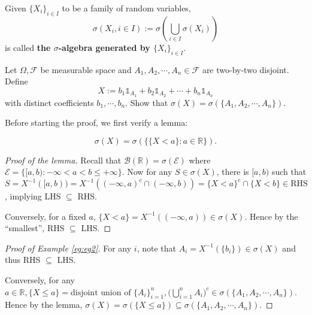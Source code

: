 \documentclass[11pt,singlecolumn, openany, citestyle=authoryear]{elegantbook}
\begin{document}
\begin{CJK}{UTF8}{gbsn}
\begin{definition}
    Given $\{X_i\}_{i \in I}$ to be a family of random variables, 
    $$
    \sigma(X_i, i \in I) := \sigma\left(\bigcup_{i \in I}\sigma(X_i)\right)
    $$ 
    is called \textbf{the $\sigma$-algebra generated by $\{X_i\}_{i \in I}$}.
\end{definition}
\begin{example}\label{eg:eg2}
    Let $\Omega, \mathcal{F}$ be measurable space and $A_1 ,A_2,\cdots,A_n \in 
    \mathcal{F}$ are two-by-two disjoint. Define 
    $$
    X:= b_1\mathds{1}_{A_1}+b_2\mathds{1}_{A_2}+\cdots+b_n\mathds{1}_{A_n}
    $$
    with distinct coefficients $b_1,\cdots,b_n$. Show that 
    $\sigma(X)=\sigma(\{A_1,A_2,\cdots,A_n\})$.
\end{example}
Before starting the proof, we first verify a lemma:
\begin{lemma}\label{lem:lem4}
    $$
    \sigma(X)=\sigma(\{\{X<a\}:a \in \mathbb{R}\}).
    $$
\end{lemma}
\begin{proof}[Proof of the lemma]
    Recall that $\mathcal{B}(\mathbb{R})=\sigma(\mathcal{E})$ where 
    $\mathcal{E}=\{[a,b):-\infty < a < b \leqslant +\infty\}$. Now for any 
    $S \in \sigma(X)$, there is $[a,b)$ such that $S = X^{-1}([a,b))=X^{-1}((-\infty,a)^c\cap 
    (-\infty,b)) =\{X<a\}^c \cap \{X < b\} \in \text{RHS}$, implying 
    LHS $\subseteq$ RHS.
    
    Conversely, for a fixed $a$, $\{X<a\} = X^{-1}((-\infty,a))\in \sigma(X)$. Hence 
    by the ``smallest'', RHS $\subseteq$ LHS.
\end{proof}

\begin{proof}[Proof of Example \ref{eg:eg2}]
    For any $i$, note that $A_i = X^{-1}(\{b_i\})\in \sigma(X)$ and thus 
    RHS $\subseteq$ LHS.

    Conversely, for any $a \in \mathbb{R}, \{X\leqslant a\}= 
    \displaystyle \text{disjoint union of }\{A_i\}_{i=1}^n, \bigg(
        \bigcup_{i=1}^n A_i
    \bigg)^c \in \sigma(\{A_1,A_2,\cdots,A_n\})$. Hence by the lemma,
    $\sigma(X)=\sigma(\{X\leqslant a\})\subseteq \sigma(\{A_1,A_2,\cdots,A_n\})$. 
\end{proof}


\end{CJK}
\end{document}
